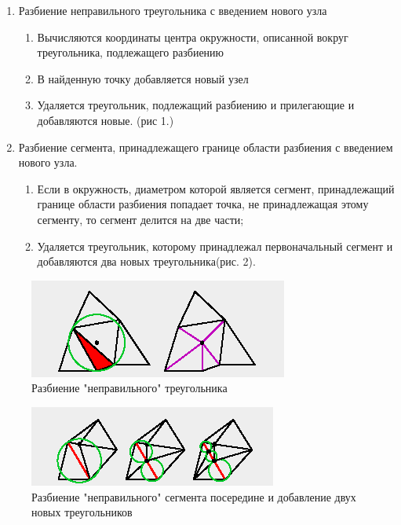 \documentclass[14pt]{extreport}
\begin{document}
\begin{enumerate}

\item Разбиение неправильного треугольника с введением нового узла

\begin{enumerate}

\item Вычисляются координаты центра окружности, описанной вокруг треугольника, подлежащего разбиению

\item В найденную точку добавляется новый узел

\item Удаляется треугольник, подлежащий разбиению и прилегающие и добавляются новые. (рис 1.)

\end{enumerate}

\item Разбиение сегмента, принадлежащего границе области разбиения с введением нового узла. 

\begin{enumerate}

\item Если в окружность, диаметром которой является сегмент, принадлежащий границе области разбиения попадает точка, не принадлежащая этому сегменту, то сегмент делится на две части;

\item Удаляется треугольник, которому принадлежал первоначальный сегмент и добавляются два новых треугольника(рис. 2).

\end{enumerate}
\end{enumerate}

\begin{figure}[H]
\centerline{\includegraphics[width=0.5\linewidth]{figs/g2dgrid3}}
\caption{Разбиение "неправильного" треугольника
}
\label{fig11}
\end{figure}


\begin{figure}[H]
\centerline{\includegraphics[width=0.5\linewidth]{figs/g2dgrid2}}
\caption{Разбиение "неправильного" сегмента посередине и добавление двух новых треугольников}
\label{fig11}
\end{figure}
\end{document}
